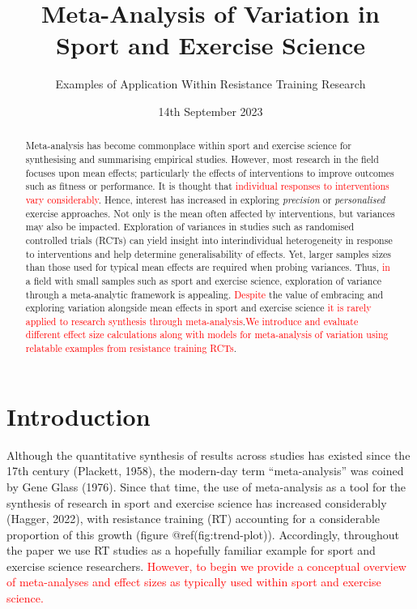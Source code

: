 \documentclass[
]{article}
\title{Meta-Analysis of Variation in Sport and Exercise Science}
\subtitle{Examples of Application Within Resistance Training Research}
\author{}
\date{14th September 2023}
\begin{document}
\maketitle
\begin{abstract}
Meta-analysis has become commonplace within sport and exercise science for synthesising and summarising empirical studies. However, most research in the field focuses upon mean effects; particularly the effects of interventions to improve outcomes such as fitness or performance. It is thought that \textcolor{red}{individual responses to interventions vary considerably}. Hence, interest has increased in exploring \emph{precision} or \emph{personalised} exercise approaches. Not only is the mean often affected by interventions, but variances may also be impacted. Exploration of variances in studies such as randomised controlled trials (RCTs) can yield insight into interindividual heterogeneity in response to interventions and help determine generalisability of effects. Yet, larger samples sizes than those used for typical mean effects are required when probing variances. Thus, \textcolor{red}{in} a field with small samples such as sport and exercise science, exploration of variance through a meta-analytic framework is appealing. \textcolor{red}{Despite} the value of embracing and exploring variation alongside mean effects in sport and exercise science \textcolor{red}{it is rarely applied to research synthesis through meta-analysis}.\textcolor{red}{We introduce and evaluate different effect size calculations along with models for meta-analysis of variation using relatable examples from resistance training RCTs}.
\end{abstract}

\hypertarget{introduction}{%
\section{Introduction}\label{introduction}}

Although the quantitative synthesis of results across studies has existed since the 17th century (Plackett, 1958), the modern-day term ``meta-analysis'' was coined by Gene Glass (1976). Since that time, the use of meta-analysis as a tool for the synthesis of research in sport and exercise science has increased considerably (Hagger, 2022), with resistance training (RT) accounting for a considerable proportion of this growth (figure @ref(fig:trend-plot)). Accordingly, throughout the paper we use RT studies as a hopefully familiar example for sport and exercise science researchers. \textcolor{red}{However, to begin we provide a conceptual overview of meta-analyses and effect sizes as typically used within sport and exercise science.}
\end{document}
